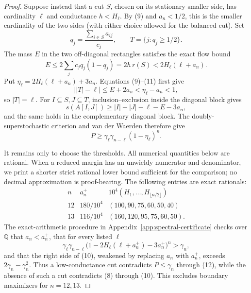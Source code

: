 \documentclass[11pt]{amsart}
\theoremstyle{definition}
\theoremstyle{remark}
\newenvironment{exacttable}
  {\begingroup\small
   \setlength{\arraycolsep}{4pt}%
   \renewcommand{\arraystretch}{1.12}}
  {\endgroup}
\begin{document}
\begin{proof}
Suppose instead that a cut \(S\), chosen on its stationary smaller side,
has cardinality \(\ell\) and conductance \(h<H_\ell\). By (9) and
\(a_n<1/2\), this is the smaller cardinality of the two sides (with either
choice allowed for the balanced cut). Set
\[
 q_j=\frac{\sum_{i\in S}a_{ij}}{c_j},\qquad
 T=\{j:q_j\geq1/2\}.
\]
The mass \(E\) in the two off-diagonal rectangles satisfies the exact flow
bound
\[
 E\leq2\sum_jc_jq_j(1-q_j)=2h\,r(S)
   <2H_\ell(\ell+a_n).                              \tag{11}
\]
Put \(\eta_\ell=2H_\ell(\ell+a_n)+3a_n\). Equations (9)--(11) first give
\[
 \bigl||T|-\ell\bigr|\leq E+2a_n<\eta_\ell-a_n<1,
\]
so \(|T|=\ell\). For \(I\subseteq S,J\subseteq T\),
inclusion--exclusion inside the diagonal block gives
\[
s(A[I,J])\geq |I|+|J|-\ell-E-3a_n,
\]
and the same holds in the complementary diagonal block. The
doubly-superstochastic criterion and van der Waerden therefore give
\[
 P\geq\gamma_\ell\gamma_{n-\ell}(1-\eta_\ell)^n.    \tag{12}
\]

It remains only to choose the thresholds. All numerical quantities below are
rational. When a reduced margin has an unwieldy numerator and denominator, we
print a shorter strict rational lower bound sufficient for the comparison;
no decimal approximation is proof-bearing. The following entries are exact
rationals:
\begin{exacttable}
\[
\begin{array}{c|c|c}
n&a_n^+&10^4(H_1,\ldots,H_{\lfloor n/2\rfloor})\\ \hline
12&180/10^4&(100,90,75,60,50,40)\\
13&116/10^4&(160,120,95,75,60,50).
\end{array}
\]
\end{exacttable}
The exact-arithmetic procedure in
Appendix~\ref{app:spectral-certificate}
checks over \(\mathbb Q\) that \(a_n<a_n^+\), that for every listed
\(\ell\)
\[
\gamma_\ell\gamma_{n-\ell}
\bigl(1-2H_\ell(\ell+a_n^+)-3a_n^+\bigr)^n>\gamma_n,
\]
and that the right side of (10), weakened by replacing \(a_n\) with
\(a_n^+\), exceeds \(2\gamma_n-\gamma_n^2\). Thus a low-conductance cut
contradicts \(P\leq\gamma_n\) through (12), while the absence of such a cut
contradicts (8) through (10). This excludes boundary maximizers for
\(n=12,13\).


\end{proof}
\end{document}
